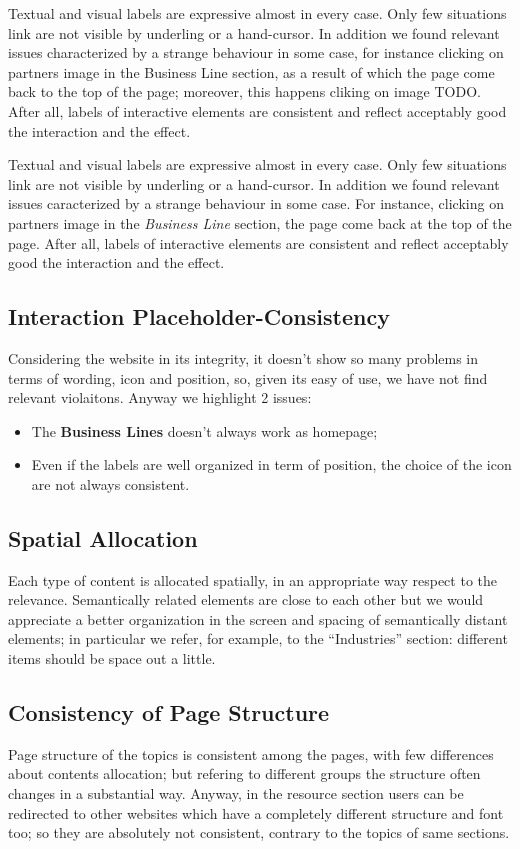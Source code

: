 Textual and visual labels are expressive almost in every case. Only few situations link are not visible by underling or a hand-cursor. In addition we found relevant issues characterized by a strange behaviour in some case, for instance clicking on partners image in the Business Line section, as a result of which the page come back to the top of the page; moreover, this happens cliking on image TODO. After all, labels of interactive elements are consistent and reflect acceptably good the interaction and the effect.

Textual and visual labels are expressive almost in every case. Only few situations link are not visible by underling or a hand-cursor. In addition we found relevant issues caracterized by a strange behaviour in some case. For instance, clicking on partners image in the \textit{Business Line} section, the page come back at the top of the page. 
After all, labels of interactive elements are consistent and reflect acceptably good the interaction and the effect.

\subsection{Interaction Placeholder-Consistency}
Considering the website in its integrity, it doesn’t show so many problems in terms of wording, icon and position, so, given its easy of use, we have not find relevant violaitons. 
Anyway we highlight 2 issues:
\begin{itemize}
\item The \textbf{Business Lines} doesn’t always work as homepage;
\item Even if the labels are well organized in term of position, the choice of the icon are not always consistent.
\end{itemize}
\subsection{Spatial Allocation}
Each type of content is allocated spatially, in an appropriate way respect to the relevance. Semantically related elements are close to each other but we would appreciate a better organization in the screen and spacing of semantically distant elements; in particular we refer, for example, to the “Industries” section: different items should be space out a little. 
\subsection{Consistency of Page Structure}
Page structure of the topics is consistent among the pages, with few differences about contents allocation; but refering to different groups the structure often changes in a substantial way.
Anyway, in the resource section users can be redirected to other websites which have a completely different structure and font too; so they are absolutely not consistent, contrary to the topics of same sections.